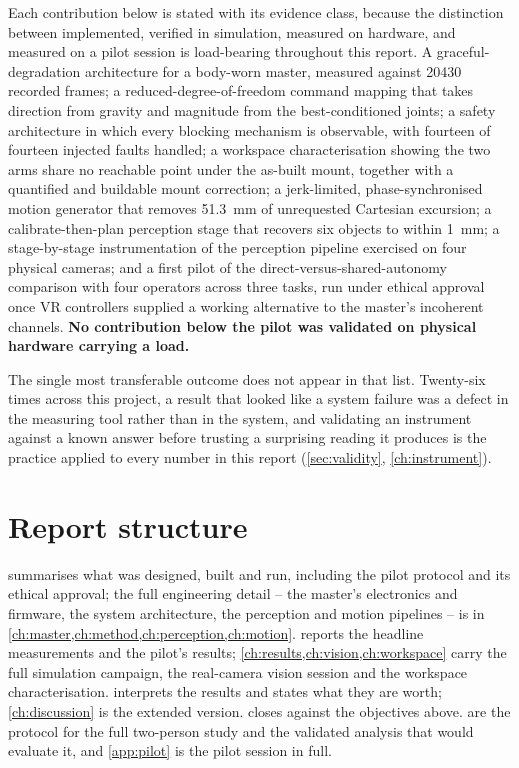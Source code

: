 Each contribution below is stated with its evidence class, because the
distinction between implemented, verified in simulation, measured on
hardware, and measured on a pilot session is load-bearing throughout this
report. A graceful-degradation architecture for a body-worn master, measured
against \num{20430} recorded frames; a reduced-degree-of-freedom command
mapping that takes direction from gravity and magnitude from the
best-conditioned joints; a safety architecture in which every blocking
mechanism is observable, with fourteen of fourteen injected faults handled; a
workspace characterisation showing the two arms share no reachable point
under the as-built mount, together with a quantified and buildable mount
correction; a jerk-limited, phase-synchronised motion generator that removes
\SI{51.3}{\milli\metre} of unrequested Cartesian excursion; a
calibrate-then-plan perception stage that recovers six objects to within
\SI{1}{\milli\metre}; a stage-by-stage instrumentation of the perception
pipeline exercised on four physical cameras; and a first pilot of the
direct-versus-shared-autonomy comparison with four operators across three
tasks, run under ethical approval once VR controllers supplied a working
alternative to the master's incoherent channels. \textbf{No contribution
below the pilot was validated on physical hardware carrying a load.}

The single most transferable outcome does not appear in that list. Twenty-six
times across this project, a result that looked like a system failure was a
defect in the measuring tool rather than in the system, and validating an
instrument against a known answer before trusting a surprising reading it
produces is the practice applied to every number in this report
(\cref{sec:validity}, \cref{ch:instrument}).

\section{Report structure}

 summarises what was designed, built and run, including
the pilot protocol and its ethical approval; the full engineering detail --
the master's electronics and firmware, the system architecture, the
perception and motion pipelines -- is in \cref{ch:master,ch:method,ch:perception,ch:motion}.
 reports the headline measurements and the pilot's
results; \cref{ch:results,ch:vision,ch:workspace} carry the full simulation
campaign, the real-camera vision session and the workspace characterisation.
 interprets the results and states what they are
worth; \cref{ch:discussion} is the extended version. 
closes against the objectives above.  are the
protocol for the full two-person study and the validated analysis that would
evaluate it, and \cref{app:pilot} is the pilot session in full.
